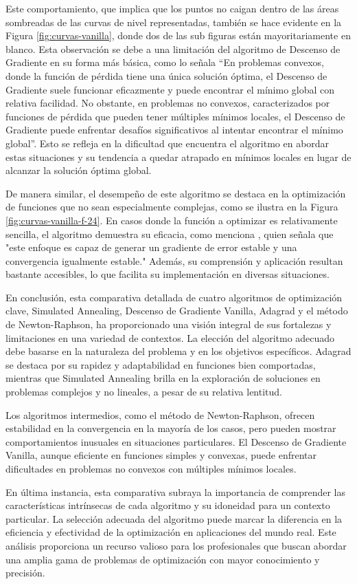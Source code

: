 \documentclass{article}
\begin{document}
Este comportamiento, que implica que los puntos no caigan dentro de las áreas sombreadas de las curvas de nivel representadas, también se hace evidente en la Figura \ref{fig:curvas-vanilla}, donde dos de las sub figuras están mayoritariamente en blanco. Esta observación se debe a una limitación del algoritmo de Descenso de Gradiente en su forma más básica, como lo señala  ``En problemas convexos, donde la función de pérdida tiene una única solución óptima, el Descenso de Gradiente suele funcionar eficazmente y puede encontrar el mínimo global con relativa facilidad. No obstante, en problemas no convexos, caracterizados por funciones de pérdida que pueden tener múltiples mínimos locales, el Descenso de Gradiente puede enfrentar desafíos significativos al intentar encontrar el mínimo global''. Esto se refleja en la dificultad que encuentra el algoritmo en abordar estas situaciones y su tendencia a quedar atrapado en mínimos locales en lugar de alcanzar la solución óptima global. 

De manera similar, el desempeño de este algoritmo se destaca en la optimización de funciones que no sean especialmente complejas, como se ilustra en la Figura \ref{fig:curvas-vanilla-f-24}. En casos donde la función a optimizar es relativamente sencilla, el algoritmo demuestra su eficacia, como menciona , quien señala que "este enfoque es capaz de generar un gradiente de error estable y una convergencia igualmente estable." Además, su comprensión y aplicación resultan bastante accesibles, lo que facilita su implementación en diversas situaciones.

En conclusión, esta comparativa detallada de cuatro algoritmos de optimización clave, Simulated Annealing, Descenso de Gradiente Vanilla, Adagrad y el método de Newton-Raphson, ha proporcionado una visión integral de sus fortalezas y limitaciones en una variedad de contextos. La elección del algoritmo adecuado debe basarse en la naturaleza del problema y en los objetivos específicos. Adagrad se destaca por su rapidez y adaptabilidad en funciones bien comportadas, mientras que Simulated Annealing brilla en la exploración de soluciones en problemas complejos y no lineales, a pesar de su relativa lentitud.

Los algoritmos intermedios, como el método de Newton-Raphson, ofrecen estabilidad en la convergencia en la mayoría de los casos, pero pueden mostrar comportamientos inusuales en situaciones particulares. El Descenso de Gradiente Vanilla, aunque eficiente en funciones simples y convexas, puede enfrentar dificultades en problemas no convexos con múltiples mínimos locales.

En última instancia, esta comparativa subraya la importancia de comprender las características intrínsecas de cada algoritmo y su idoneidad para un contexto particular. La selección adecuada del algoritmo puede marcar la diferencia en la eficiencia y efectividad de la optimización en aplicaciones del mundo real. Este análisis proporciona un recurso valioso para los profesionales que buscan abordar una amplia gama de problemas de optimización con mayor conocimiento y precisión. 

\newpage


\end{document}

